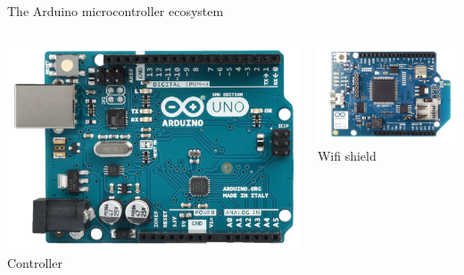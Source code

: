 \documentclass[compress]{beamer}
\begin{document}
\begin{frame}{The Arduino microcontroller ecosystem}
    \begin{columns}
        \begin{column}{0.3\linewidth}
            \begin{center}
                \includegraphics[width=\linewidth]{arduino-uno}
                Controller
            \end{center}
        \end{column}
        \begin{column}{0.3\linewidth}
            \begin{center}
                \includegraphics[width=\linewidth]{wifi-shield}
                Wifi shield
            \end{center}


\end{column}
\end{columns}
\end{frame}
\end{document}
